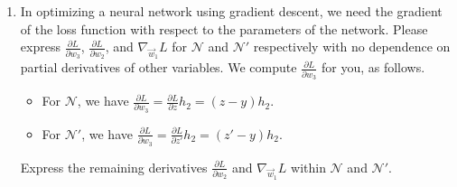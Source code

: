 \documentclass[10pt]{article}
\theoremstyle{definition}
\theoremstyle{plain}
\begin{document}
\begin{enumerate}[label=(\alph*)]
\textbf{Solution:}
\begin{align}
\frac{\partial L}{\partial w_2} &= \frac{\partial L}{\partial p_2} h_1 \\
\frac{\partial L}{\partial h_1} &= \frac{\partial L}{\partial z'}\frac{\partial z'}{\partial h_1} = \frac{\partial L}{\partial z'}\left(1 + w_3 \frac{\partial h_2}{\partial h_1}\right) = \frac{\partial L}{\partial z'}\left(1 + w_3 \sigma'(p_2) w_2\right) = \frac{\partial L}{\partial z'}(1 + w_3 \sigma'(p_2) w_2) \\
\frac{\partial L}{\partial p_1} &= \frac{\partial L}{\partial z'}\frac{\partial z'}{\partial p_1} = \frac{\partial L}{\partial z'}\left(w_3 \frac{\partial h_2}{\partial h_1}\frac{\partial h_1}{\partial p_1} + \frac{\partial h_1}{\partial p_1}\right) = \frac{\partial L}{\partial z'}(w_3 \sigma'(p_2) w_2 \sigma'(p_1) + \sigma'(p_1)) \\
\nabla_{\vec{w}_1} L &= \frac{\partial L}{\partial p_1} \vec{x} \\
\nabla_{\vec{x}} L &= \frac{\partial L}{\partial p_1} \vec{w}_1
\end{align}

\item In optimizing a neural network using gradient descent, we need the gradient of the loss function with respect to the parameters of the network. Please express $\frac{\partial L}{\partial w_3}$, $\frac{\partial L}{\partial w_2}$, and $\nabla_{\vec{w}_1} L$ for $\mathcal{N}$ and $\mathcal{N}'$ respectively with no dependence on partial derivatives of other variables. We compute $\frac{\partial L}{\partial w_3}$ for you, as follows.

\begin{itemize}
    \item For $\mathcal{N}$, we have $\frac{\partial L}{\partial w_3} = \frac{\partial L}{\partial z} h_2 = (z - y) h_2$.
    \item For $\mathcal{N}'$, we have $\frac{\partial L}{\partial w_3} = \frac{\partial L}{\partial z'} h_2 = (z' - y) h_2$.
\end{itemize}

Express the remaining derivatives $\frac{\partial L}{\partial w_2}$ and $\nabla_{\vec{w}_1} L$ within $\mathcal{N}$ and $\mathcal{N}'$.


\end{enumerate}
\end{document}
